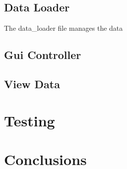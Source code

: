\documentclass[11pt]{report}
\begin{document}
\section{Data Loader}
The data\_loader file manages the data 
\section{Gui Controller}
\section{View Data}

\chapter{Testing}

\chapter{Conclusions}



\end{document}
